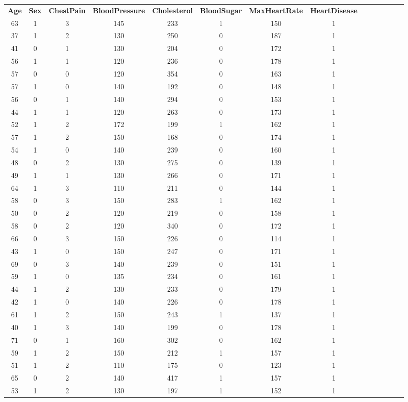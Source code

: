 \documentclass{article}
\begin{document}
\begin{longtable}{|c|c|c|c|c|c|c|c|c|c|c|c|c|c|}
\textbf{Age} & \textbf{Sex} & \textbf{ChestPain} & \textbf{BloodPressure} & \textbf{Cholesterol} & \textbf{BloodSugar} & \textbf{MaxHeartRate} & \textbf{HeartDisease}\\
63 & 1 & 3 & 145 & 233 & 1 & 150 & 1\\
37 & 1 & 2 & 130 & 250 & 0 & 187 & 1\\
41 & 0 & 1 & 130 & 204 & 0 & 172 & 1\\
56 & 1 & 1 & 120 & 236 & 0 & 178 & 1\\
57 & 0 & 0 & 120 & 354 & 0 & 163 & 1\\
57 & 1 & 0 & 140 & 192 & 0 & 148 & 1\\
56 & 0 & 1 & 140 & 294 & 0 & 153 & 1\\
44 & 1 & 1 & 120 & 263 & 0 & 173 & 1\\
52 & 1 & 2 & 172 & 199 & 1 & 162 & 1\\
57 & 1 & 2 & 150 & 168 & 0 & 174 & 1\\
54 & 1 & 0 & 140 & 239 & 0 & 160 & 1\\
48 & 0 & 2 & 130 & 275 & 0 & 139 & 1\\
49 & 1 & 1 & 130 & 266 & 0 & 171 & 1\\
64 & 1 & 3 & 110 & 211 & 0 & 144 & 1\\
58 & 0 & 3 & 150 & 283 & 1 & 162 & 1\\
50 & 0 & 2 & 120 & 219 & 0 & 158 & 1\\
58 & 0 & 2 & 120 & 340 & 0 & 172 & 1\\
66 & 0 & 3 & 150 & 226 & 0 & 114 & 1\\
43 & 1 & 0 & 150 & 247 & 0 & 171 & 1\\
69 & 0 & 3 & 140 & 239 & 0 & 151 & 1\\
59 & 1 & 0 & 135 & 234 & 0 & 161 & 1\\
44 & 1 & 2 & 130 & 233 & 0 & 179 & 1\\
42 & 1 & 0 & 140 & 226 & 0 & 178 & 1\\
61 & 1 & 2 & 150 & 243 & 1 & 137 & 1\\
40 & 1 & 3 & 140 & 199 & 0 & 178 & 1\\
71 & 0 & 1 & 160 & 302 & 0 & 162 & 1\\
59 & 1 & 2 & 150 & 212 & 1 & 157 & 1\\
51 & 1 & 2 & 110 & 175 & 0 & 123 & 1\\
65 & 0 & 2 & 140 & 417 & 1 & 157 & 1\\
53 & 1 & 2 & 130 & 197 & 1 & 152 & 1\\

\end{longtable}
\end{document}
